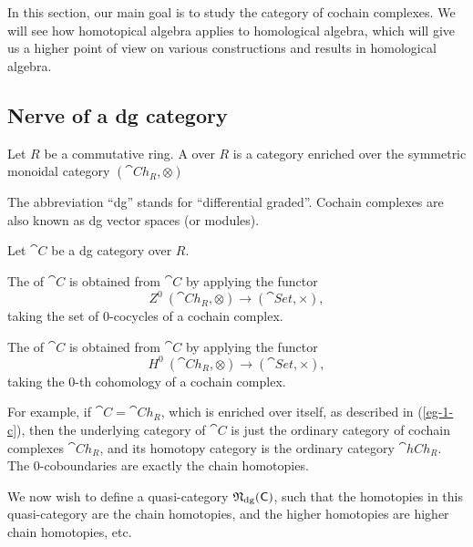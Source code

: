 In this section, our main goal is to study the category of cochain complexes.
We will see how homotopical algebra applies to homological algebra,
which will give us a higher point of view on various
constructions and results in homological algebra.

\subsection{Nerve of a dg category}

\begin{definition}
    Let $R$ be a commutative ring.
    A  over $R$ is a category enriched over the
    symmetric monoidal category $(\cat{Ch}_R,\otimes)$
\end{definition}

The abbreviation ``dg'' stands for ``differential graded''.
Cochain complexes are also known as dg vector spaces (or modules).

\begin{definition}
    Let $\cat{C}$ be a dg category over $R$.
    \begin{itms}
        \item The  of $\cat{C}$
        is obtained from $\cat{C}$ by applying the functor 
        \[Z^0\:(\cat{Ch}_R,\otimes)\to(\cat{Set},\times),\]
        taking the set of $0$-cocycles of a cochain complex.
        \item The  of $\cat{C}$
        is obtained from $\cat{C}$ by applying the functor 
        \[H^0\:(\cat{Ch}_R,\otimes)\to(\cat{Set},\times),\]
        taking the $0$-th cohomology of a cochain complex.
    \end{itms}
\end{definition}

For example, if $\cat{C}=\cat{Ch}_R$,
which is enriched over itself, as described in (\ref{eg-1-c}),
then the underlying category of $\cat{C}$ is just the ordinary
category of cochain complexes $\cat{Ch}_R$,
and its homotopy category is the ordinary category $\cat{hCh}_R$.
The $0$-coboundaries are exactly the chain homotopies.

We now wish to define a quasi-category $\mathfrak{N}_{\mathrm{dg}}(\mathsf{C})$,
such that the homotopies in this quasi-category are the chain homotopies,
and the higher homotopies are higher chain homotopies, etc.

